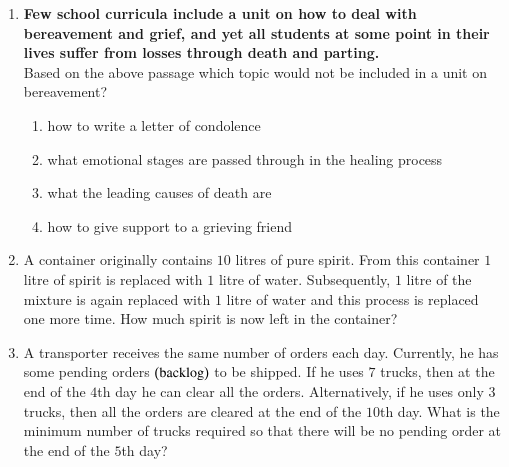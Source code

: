 \documentclass[journal]{IEEEtran}
\begin{document}
\begin{enumerate}[start=53]
\begin{enumerate}
\end{enumerate}
\item \textbf{Few school curricula include a unit on how to deal with bereavement and grief, and yet all students at some point in their lives suffer from losses through death and parting.}\\
Based on the above passage which topic would not be included in a unit on bereavement?\\
\begin{enumerate}
    \item how to write a letter of condolence
    \item what emotional stages are passed through in the healing process
    \item what the leading causes of death are
    \item how to give support to a grieving friend
\end{enumerate}
\item A container originally contains $10$ litres of pure spirit. From this container $1$ litre of spirit is replaced with $1$ litre of water. Subsequently, $1$ litre of the mixture is again replaced with $1$ litre of water and this process is replaced one more time. How much spirit is now left in the container?
\begin{enumerate}
\end{enumerate}
\item A transporter receives the same number of orders each day. Currently, he has some pending orders $\left(\text{backlog}\right)$ to be shipped. If he uses $7$ trucks, then at the end of the $4$th day he can clear all the orders. Alternatively, if he uses only $3$ trucks, then all the orders are cleared at the end of the $10$th day. What is the minimum number of trucks required so that there will be no pending order at the end of the $5$th day?
\begin{enumerate}

\end{enumerate}
\end{enumerate}
\end{document}
